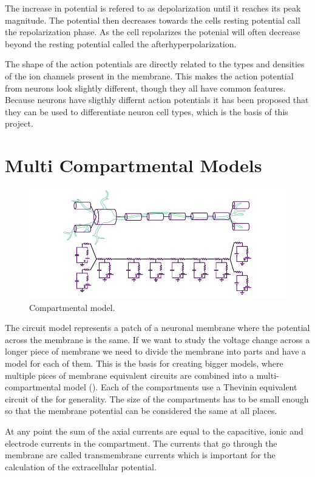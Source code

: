 \documentclass[altfont, fleqn]{uiophd}
\renewcommand{\cref}[1]{{\color{viridis_03}\mycref{#1}}}
\begin{document}
The increase in potential is refered to as depolarization
until it reaches its peak magnitude. 
The potential then decreases towards the cells resting potential
call the repolarization phase. 
As the cell repolarizes the potenial will often decrease beyond the resting
potential called the afterhyperpolarization. 

The shape of the action potentials are directly 
related to the types and densities
of the ion channels present in the membrane. 
This makes the action potential from neurons look slightly different, 
though they all have common features. 
Because neurons have sligthly differnt action potentials
it has been proposed that they can be used to differentiate
neuron cell types, which is the basis of this project. 

\section{Multi Compartmental Models}
\begin{figure}[h]
    \centering
    \includegraphics[width=1.0\textwidth]{images/2_1/compartments.pdf}
    \caption{Compartmental model.}
    \label{fig:2_comp_mod}
\end{figure}
The circuit model represents a patch of a neuronal membrane
where the potential across the membrane is the same. 
If we want to study the voltage change across a longer piece of 
membrane we need to divide the membrane into parts and have a model for
each of them. 
This is the basis for creating bigger models, where multiple pices
of membrane equivalent circuits are combined into a multi-compartmental
model
(\cref{fig:2_comp_mod}).
Each of the compartments use a Thevinin equivalent circuit 
of the for generality.  
The size of the compartments has to be small enough so that the membrane potential
can be considered the same at all places. 

At any point the sum of the axial currents are equal to
the capacitive, ionic and electrode currents in the compartment. 
The currents that go through the membrane are called transmembrane currents
which is important for the calculation of the extracellular potential. 
\end{document}
